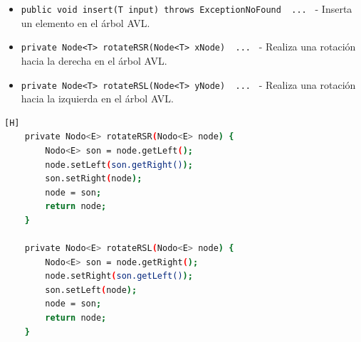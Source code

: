 \documentclass{article}
\begin{document}
	\begin{itemize}
	\item \texttt{public void insert(T input) throws ExceptionNoFound { ... }} - Inserta un elemento en el árbol AVL.
\item \texttt{private Node<T> rotateRSR(Node<T> xNode) { ... }} - Realiza una rotación hacia la derecha en el árbol AVL.
\item \texttt{private Node<T> rotateRSL(Node<T> yNode) { ... }} - Realiza una rotación hacia la izquierda en el árbol AVL.
	\end{itemize}
	\begin{lstlisting}[language=bash,caption={Clase AVL: Metodos de rotación derecha e izquierda}][H]   
	private Nodo<E> rotateRSR(Nodo<E> node) {
        Nodo<E> son = node.getLeft();
        node.setLeft(son.getRight());
        son.setRight(node);
        node = son;
        return node;
    }

    private Nodo<E> rotateRSL(Nodo<E> node) {
        Nodo<E> son = node.getRight();
        node.setRight(son.getLeft());
        son.setLeft(node);
        node = son;
        return node;
    }
	\end{lstlisting}	
	
\end{document}
